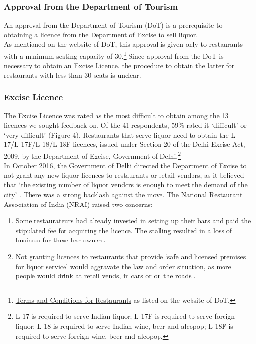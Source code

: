 \documentclass[a4paper, 12pt, twoside]{article}
\begin{document}
		

		\subsubsection{Approval from the Department of Tourism}
		An approval from the Department of Tourism (DoT) is a prerequisite to obtaining a licence from the Department of Excise to sell liquor. \\
		
		As mentioned on the website of DoT, this approval is given only to restaurants with a minimum seating capacity of 30.\footnote{\href{https://bit.ly/2NMdccI}{Terms and Conditions for Restaurants} as listed on the website of DoT.}  Since approval from the DoT is necessary to obtain an Excise Licence, the procedure to obtain the latter for restaurants with less than 30 seats is unclear. %
		
		\subsubsection{Excise Licence}
		The Excise Licence was rated as the most difficult to obtain among the 13 licences we sought feedback on. Of the 41 respondents, 59\% rated it ‘difficult’ or ‘very difficult’ (Figure 4). Restaurants that serve liquor need to obtain the L-17/L-17F/L-18/L-18F licences, issued under Section 20 of the Delhi Excise Act, 2009, by the Department of Excise, Government of Delhi.\footnote{L-17 is required to serve Indian liquor; L-17F is required to serve foreign liquor; L-18 is required to serve Indian wine, beer and alcopop; L-18F is required to serve foreign wine, beer and alcopop.} \\ %
		
		In October 2016, the Government of Delhi directed the Department of Excise to not grant any new liquor licences to restaurants or retail vendors, as it believed that ‘the existing number of liquor vendors is enough to meet the demand of the city’ \parencite{toi2016nonewliqlicense}. There was a strong backlash against the move. The National Restaurant Association of India (NRAI) raised two concerns:
		\begin {enumerate}
			\item Some restaurateurs had already invested in setting up their bars and paid the stipulated fee for acquiring the licence. The stalling resulted in a loss of business for these bar owners.
			\item Not granting licences to restaurants that provide ‘safe and licensed premises for liquor service’ would aggravate the law and order situation, as more people would drink at retail vends, in cars or on the roads \parencite{toi2016nonewliqlicense}.
		\end {enumerate}
		
\end{document}
